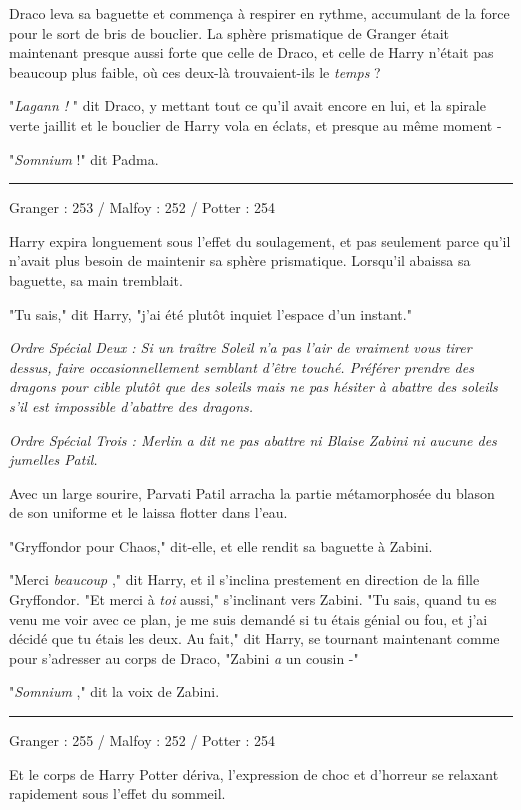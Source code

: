 Draco leva sa baguette et commença à respirer en rythme, accumulant de la force pour le sort de bris de bouclier. La sphère prismatique de Granger était maintenant presque aussi forte que celle de Draco, et celle de Harry n'était pas beaucoup plus faible, où ces deux-là trouvaient-ils le \emph{temps}  ?

"\emph{Lagann !} " dit Draco, y mettant tout ce qu'il avait encore en lui, et la spirale verte jaillit et le bouclier de Harry vola en éclats, et presque au même moment -

"\emph{Somnium}  !" dit Padma.
\par\noindent\rule{\textwidth}{0.4pt}
Granger : 253 / Malfoy : 252 / Potter : 254

Harry expira longuement sous l'effet du soulagement, et pas seulement parce qu'il n'avait plus besoin de maintenir sa sphère prismatique. Lorsqu'il abaissa sa baguette, sa main tremblait.

"Tu sais," dit Harry, "j'ai été plutôt inquiet l'espace d'un instant."

\emph{Ordre Spécial Deux : Si un traître Soleil n'a pas l'air de vraiment vous tirer dessus, faire occasionnellement semblant d'être touché. Préférer prendre des dragons pour cible plutôt que des soleils mais ne pas hésiter à abattre des soleils s'il est impossible d'abattre des dragons.} 

\emph{Ordre Spécial Trois : Merlin a dit ne pas abattre ni Blaise Zabini ni aucune des jumelles Patil.} 

Avec un large sourire, Parvati Patil arracha la partie métamorphosée du blason de son uniforme et le laissa flotter dans l'eau.

"Gryffondor pour Chaos," dit-elle, et elle rendit sa baguette à Zabini.

"Merci \emph{beaucoup} ," dit Harry, et il s'inclina prestement en direction de la fille Gryffondor. "Et merci à \emph{toi}  aussi," s'inclinant vers Zabini. "Tu sais, quand tu es venu me voir avec ce plan, je me suis demandé si tu étais génial ou fou, et j'ai décidé que tu étais les deux. Au fait," dit Harry, se tournant maintenant comme pour s'adresser au corps de Draco, "Zabini \emph{a}  un cousin -"

"\emph{Somnium} ," dit la voix de Zabini.
\par\noindent\rule{\textwidth}{0.4pt}
Granger : 255 / Malfoy : 252 / Potter : 254

Et le corps de Harry Potter dériva, l'expression de choc et d'horreur se relaxant rapidement sous l'effet du sommeil.

